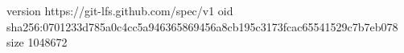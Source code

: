 version https://git-lfs.github.com/spec/v1
oid sha256:0701233d785a0c4cc5a946365869456a8cb195c3173fcac65541529c7b7eb078
size 1048672
